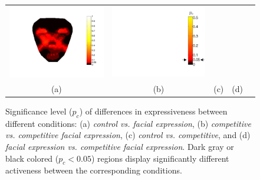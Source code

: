 \documentclass[10pt,journal,compsoc]{IEEEtran}
\begin{document}
\begin{figure}[t!]
\begin{center}
\begin{tabular}{c c c c c}
  \includegraphics[height=0.5\columnwidth]{fc2-4.pdf}   &\includegraphics[height=0.5\columnwidth]{fc_legend.pdf}  \\
    (a)& (b)& (c)& (d)\\%
 \end{tabular}
\end{center}
\caption{%
Significance level ($p_c$) of differences in expressiveness
between different conditions: (a) \emph{control vs. facial
expression}, (b) \emph{competitive vs. competitive facial
expression}, (c) \emph{control vs. competitive}, and (d)
\emph{facial expression vs. competitive facial expression}.
Dark gray or black colored ($p_c<0.05$) regions display
significantly different activeness between the corresponding
conditions.} \label{markers}
\end{figure}
\end{document}
